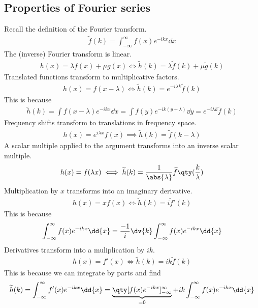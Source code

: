 \subsection{Properties of Fourier series}
Recall the definition of the Fourier transform.
\begin{align*}
	\widetilde f(k) = \int_{-\infty}^\infty f(x) e^{-ikx} \dd{x}
\end{align*}
The (inverse) Fourier transform is linear.
\begin{align*}
	h(x) = \lambda f(x) + \mu g(x) \iff \widetilde h(k) = \lambda \widetilde f(k) + \mu \widetilde g(k)
\end{align*}
Translated functions transform to multiplicative factors.
\begin{align*}
	h(x) = f(x - \lambda) \iff \widetilde h(k) = e^{-i\lambda k} \widetilde f(k)
\end{align*}
This is because
\begin{align*}
	\widetilde h(k) = \int f(x - \lambda) e^{-ikx} \dd{x} = \int f(y) e^{-ik(y + \lambda)} \dd{y} = e^{-i\lambda k} \widetilde f(k)
\end{align*}
Frequency shifts transform to translations in frequency space.
\begin{align*}
	h(x) = e^{i\lambda x}f(x) \implies \widetilde h(k) = \widetilde f(k - \lambda)
\end{align*}
A scalar multiple applied to the argument transforms into an inverse scalar multiple.
\begin{align*}
	h(x) = f(\lambda x) \iff \widetilde h(k) = \frac{1}{\abs{\lambda}} \widetilde f\qty(\frac{k}{\lambda})
\end{align*}
Multiplication by $x$ transforms into an imaginary derivative.
\begin{align*}
	h(x) = xf(x) \iff \widetilde h(k) = i\widetilde f'(k)
\end{align*}
This is because
\begin{align*}
	\int_{-\infty}^\infty f(x) e^{-ikx} \dd{x} = \frac{-1}{i} \dv{k} \int_{-\infty}^\infty f(x) e^{-ikx} \dd{x}
\end{align*}
Derivatives transform into a muliplication by $ik$.
\begin{align*}
	h(x) = f'(x) \iff \widetilde h(k) = ik \widetilde f(k)
\end{align*}
This is because we can integrate by parts and find
\begin{align*}
	\widetilde h(k) = \int_{-\infty}^\infty f'(x) e^{-ikx} \dd{x} = \underbrace{\qty[f(x) e^{-ikx}]_{-\infty}^\infty}_{=0} + ik\int_{-\infty}^\infty f(x) e^{-ikx} \dd{x}
\end{align*}

